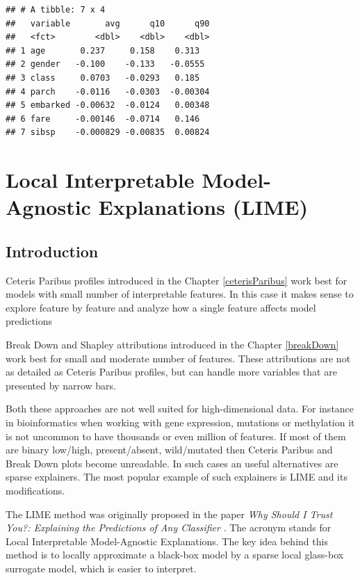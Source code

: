 \documentclass[12pt,]{krantz}
\theoremstyle{definition}
\theoremstyle{definition}
\theoremstyle{definition}
\theoremstyle{remark}
\begin{document}
\begin{verbatim}
## # A tibble: 7 x 4
##   variable       avg      q10      q90
##   <fct>        <dbl>    <dbl>    <dbl>
## 1 age       0.237     0.158    0.313  
## 2 gender   -0.100    -0.133   -0.0555 
## 3 class     0.0703   -0.0293   0.185  
## 4 parch    -0.0116   -0.0303  -0.00304
## 5 embarked -0.00632  -0.0124   0.00348
## 6 fare     -0.00146  -0.0714   0.146  
## 7 sibsp    -0.000829 -0.00835  0.00824
\end{verbatim}

\hypertarget{LIME}{%
\section{Local Interpretable Model-Agnostic Explanations
(LIME)}\label{LIME}}

\hypertarget{introduction-1}{%
\subsection{Introduction}\label{introduction-1}}

Ceteris Paribus profiles introduced in the Chapter \ref{ceterisParibus}
work best for models with small number of interpretable features. In
this case it makes sense to explore feature by feature and analyze how a
single feature affects model predictions

Break Down and Shapley attributions introduced in the Chapter
\ref{breakDown} work best for small and moderate number of features.
These attributions are not as detailed as Ceteris Paribus profiles, but
can handle more variables that are presented by narrow bars.

Both these approaches are not well suited for high-dimensional data. For
instance in bioinformatics when working with gene expression, mutations
or methylation it is not uncommon to have thousands or even million of
features. If most of them are binary low/high, present/absent,
wild/mutated then Ceteris Paribus and Break Down plots become
unreadable. In such cases an useful alternatives are sparse explainers.
The most popular example of such explainers is LIME and its
modifications.

The LIME method was originally proposed in the paper \emph{Why Should I
Trust You?: Explaining the Predictions of Any Classifier} \citep{lime}.
The acronym stands for Local Interpretable Model-Agnostic Explanations.
The key idea behind this method is to locally approximate a black-box
model by a sparse local glass-box surrogate model, which is easier to
interpret.
\end{document}
